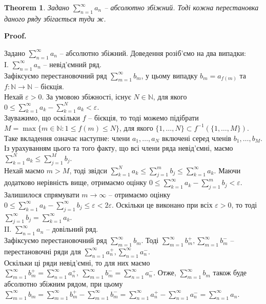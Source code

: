 \documentclass[a4paper, 10pt]{article}
\makeatletter
\def\qed{$\blacksquare$}
\theoremstyle{theoremdd}
\newtheorem{theorem}{Theorem}[subsection]
\theoremstyle{theoremdd}
\theoremstyle{theoremdd}
\theoremstyle{theoremdd}
\theoremstyle{theoremdd}
\theoremstyle{theoremdd}
\theoremstyle{theoremdd}
\theoremstyle{theoremdd}
\theoremstyle{theoremdd}
\renewenvironment{proof}[1][Proof.\\]{\par
\pushQED{\hfill \qed}%
\normalfont \topsep6\p@\@plus6\p@\relax
\trivlist
\item\relax
{\bfseries
#1\@addpunct{.}}\hspace\labelsep\ignorespaces
}{%
\popQED\endtrivlist\@endpefalse
}
\makeatother
\begin{document}
\begin{theorem}
Задано $\displaystyle \sum_{n=1}^\infty a_n$ -- абсолютно збіжний. Тоді кожна перестановка даного ряду збігається туди ж.
\end{theorem}

\begin{proof}
Задано $\displaystyle \sum_{n=1}^\infty a_n$ -- абсолютно збіжний. Доведення розіб'ємо на два випадки:\\
I. $\displaystyle\sum_{n=1}^\infty a_n$ -- невід'ємний ряд.\\
Зафіксуємо перестановочний ряд $\displaystyle\sum_{m=1}^\infty b_m$, у цьому випадку $b_m = a_{f(m)}$ та $f \colon \mathbb{N} \to \mathbb{N}$ -- бієкція.\\
Нехай $\varepsilon > 0$. За умовою збіжності, існує $N \in \mathbb{N}$, для якого $0 \leq \displaystyle\sum_{k=1}^\infty a_k - \sum_{k=1}^N a_k < \varepsilon$.\\
Зауважимо, що оскільки $f$ -- бієкція, то тоді можемо підібрати $M = \max\{m \in \mathbb{N} : 1 \leq f(m) \leq N\}$, для якого $\{1,\dots,N\} \subset f^{-1}(\{1,\dots,M\})$. Таке вкладення означає наступне: члени $a_1,\dots,a_N$ включені серед членів $b_1,\dots,b_M$. Із урахуванням цього та того факту, що всі члени ряда невід'ємні, маємо $\displaystyle\sum_{k=1}^N a_k \leq \sum_{j=1}^M b_j$. \\
Нехай маємо $m > M$, тоді звідси $\displaystyle\sum_{k=1}^N a_k \leq \sum_{j=1}^m b_j \leq \sum_{k=1}^\infty a_k$. Маючи додатково нерівність вище, отримаємо оцінку $0 \leq \displaystyle\sum_{k=1}^\infty a_k - \sum_{j=1}^m b_j < \varepsilon$. Залишилося спрямувати $m \to \infty$ -- отримаємо оцінку $\displaystyle 0 \leq \sum_{k=1}^\infty a_k - \sum_{j=1}^\infty b_j \leq \varepsilon < 2 \varepsilon$. Оскільки це виконано при всіх $\varepsilon > 0$, то тоді $\displaystyle\sum_{j=1}^\infty b_j = \sum_{k=1}^\infty a_k$.
\bigskip \\
II. $\displaystyle\sum_{n=1}^\infty a_n$ -- довільний ряд.\\
Зафіксуємо перестановочний ряд $\displaystyle\sum_{m=1}^\infty b_m$. Тоді $\displaystyle\sum_{m=1}^\infty b_m^+, \sum_{m=1}^\infty b_m^-$ -- перестановочні ряди для $\displaystyle\sum_{n=1}^\infty a_n^+,\sum_{n=1}^\infty a_n^-$.\\
Оскільки ці ряди невід'ємні, то для них маємо $\displaystyle\sum_{m=1}^\infty b_m^+ = \sum_{n=1}^\infty a_n^+,\ \sum_{m=1}^\infty b_m^- = \sum_{n=1}^\infty a_n^-$. Отже, $\displaystyle\sum_{m=1}^\infty b_m$ також буде абсолютно збіжним рядом, при цьому\\
$\displaystyle\sum_{m=1}^\infty b_m = \sum_{m=1}^\infty b_m^+ - \sum_{m=1}^\infty b_m^- = \sum_{n=1}^\infty a_n^+ - \sum_{n=1}^\infty a_n^- = \sum_{n=1}^\infty a_n$.
\end{proof}
\end{document}
